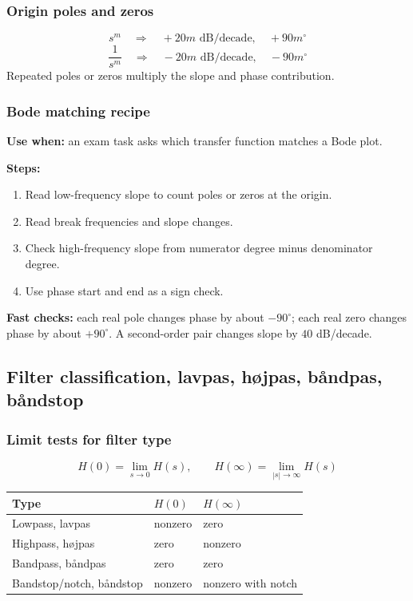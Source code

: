 \subsubsection{Origin poles and zeros}
\[
s^m\quad\Rightarrow\quad +20m\text{ dB/decade},\quad +90m^\circ
\]
\[
\frac{1}{s^m}\quad\Rightarrow\quad -20m\text{ dB/decade},\quad -90m^\circ
\]
Repeated poles or zeros multiply the slope and phase contribution.

\subsubsection{Bode matching recipe}
\textbf{Use when:} an exam task asks which transfer function matches a Bode plot.

\textbf{Steps:}
\begin{enumerate}
    \item Read low-frequency slope to count poles or zeros at the origin.
    \item Read break frequencies and slope changes.
    \item Check high-frequency slope from numerator degree minus denominator degree.
    \item Use phase start and end as a sign check.
\end{enumerate}

\textbf{Fast checks:} each real pole changes phase by about \(-90^\circ\); each real zero changes phase by about \(+90^\circ\). A second-order pair changes slope by \(40\) dB/decade.

\subsection{Filter classification, lavpas, højpas, båndpas, båndstop}

\subsubsection{Limit tests for filter type}
\[
H(0)=\lim_{s\to0}H(s),\qquad
H(\infty)=\lim_{|s|\to\infty}H(s)
\]
\begin{tabular}{lll}
\toprule
Type & \(H(0)\) & \(H(\infty)\) \\
\midrule
Lowpass, lavpas & nonzero & zero \\
Highpass, højpas & zero & nonzero \\
Bandpass, båndpas & zero & zero \\
Bandstop/notch, båndstop & nonzero & nonzero with notch \\
\bottomrule
\end{tabular}

